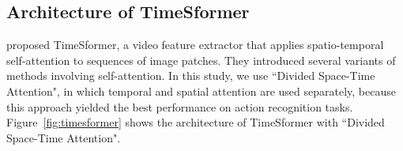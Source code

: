 \documentclass[letterpaper]{article} %
\begin{document}
%

\subsection{Architecture of TimeSformer}
\citet{Bertasius2021is} proposed TimeSformer, a video feature extractor that applies spatio-temporal self-attention to sequences of image patches.
They introduced several variants of methods involving self-attention.
In this study, we use ``Divided Space-Time Attention", in which temporal and spatial attention are used separately, because this approach yielded the best performance on action recognition tasks.
Figure~\ref{fig:timesformer} shows the architecture of TimeSformer with ``Divided Space-Time Attention".
\end{document}
